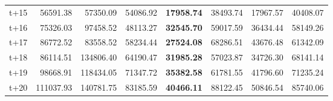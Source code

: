 \begin{table}[H]
\begin{tabular}{lrrrrrrr}
t+15  & 56591.38  & 57350.09  & 54086.92  & \textbf{17958.74}  & 38493.74  & 17967.57  & 40408.07  \\
t+16  & 75326.03  & 97458.52  & 48113.27  & \textbf{32545.70}  & 59017.59  & 36434.44  & 58149.26  \\
t+17  & 86772.52  & 83558.52  & 58234.44  & \textbf{27524.08}  & 68286.51  & 43676.48  & 61342.09  \\
t+18  & 86114.51  & 134806.40  & 64190.47  & \textbf{31985.28}  & 57023.87  & 34726.30  & 68141.14  \\
t+19  & 98668.91  & 118434.05  & 71347.72  & \textbf{35382.58}  & 61781.55  & 41796.60  & 71235.24  \\
t+20  & 111037.93  & 140781.75  & 83185.59  & \textbf{40466.11}  & 88122.45  & 50846.54  & 85740.06  \\

\bottomrule
\end{tabular}
\end{table}
